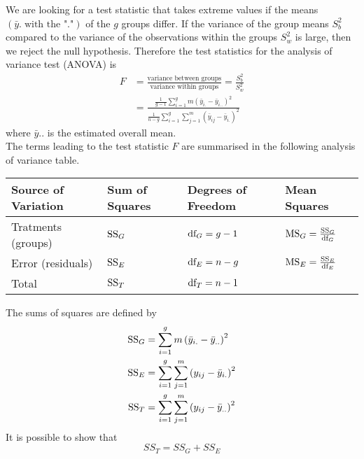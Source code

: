 We are looking for a test statistic that takes extreme values if the means $(\bar{y}. \;\text{with the "."})$ of the $g$ groups differ. If the variance
of the group means $S_b^2$ compared to the variance of the observations within the groups $S_w^2$ is large, then we reject the null hypothesis. Therefore the test statistics for the analysis of variance test (ANOVA) is
\begin{equation}
  \begin{split}
    F &= \frac{\text{variance between groups}}{\text{variance within groups}} = \frac{S_b^2}{S_w^2}\\
    &= \frac{\frac{1}{g-1} \sum_{i=1}^g m\left(\bar{y}_{i.} - \bar{y}_{i..}\right)^2}{\frac{1}{n-g} \sum_{i=1}^g \sum_{j=1}^m \left(\bar{y}_{ij} - \bar{y}_{i.}\right)^2}
  \end{split}
\end{equation}
where $\bar{y}..$ is the estimated overall mean.\\
The terms leading to the test statistic $F$ are summarised in the following analysis of variance table.
\begin{table}[H]
  \centering
  \footnotesize
  \begin{tabular}{ m{1.5cm} | m{1cm} ll}
      Source of Variation  & Sum of Squares & Degrees of Freedom & Mean Squares \\ \hline
      Tratments (groups)  & $\textup{SS}_G$ & $\textup{df}_G = g-1$ & $\textup{MS}_G = \frac{\textup{SS}_G}{\textup{df}_G}$\\
      Error (residuals)   & $\textup{SS}_E$ & $\textup{df}_E = n-g$ & $\textup{MS}_E = \frac{\textup{SS}_E}{\textup{df}_E}$\\ \hline
      Total               & $\textup{SS}_T$ & $\textup{df}_T = n-1$ &\\
  \end{tabular}
\end{table}

The sums of squares are defined by
\begin{equation*}
  \begin{split}
    \textup{SS}_G &= \sum_{i=1}^g m\left(\bar{y}_{i.} - \bar{y}_{..}\right)^2\\
    \textup{SS}_E &= \sum_{i=1}^g \sum_{j=1}^m \left(y_{ij} - \bar{y}_{i.}\right)^2\\
    \textup{SS}_T &= \sum_{i=1}^g \sum_{j=1}^m \left(y_{ij} - \bar{y}_{..}\right)^2
  \end{split}
\end{equation*}
It is possible to show that
\begin{equation}
  SS_T = SS_G + SS_E
\end{equation}

